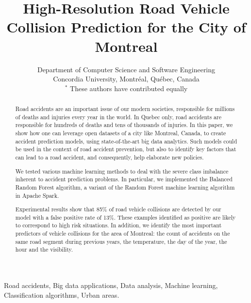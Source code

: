 \documentclass[conference]{IEEEtran}
\begin{document}
\title{High-Resolution Road Vehicle Collision Prediction for the City of Montreal}
\author{
Department of Computer Science and Software Engineering \\
Concordia University, Montréal, Québec, Canada\\
$^*$ These authors have contributed equally

}

\maketitle

\begin{abstract}

Road accidents are an important issue of our modern societies, responsible
for millions of deaths and injuries every year in the world. In Quebec only, road accidents are responsible for hundreds of deaths and tens of thousands of injuries. 
In this paper, we show how one can leverage open datasets of a city like
Montreal, Canada, to create accident prediction models, using state-of-the-art
big data analytics.
Such models could be used in the context of road accident prevention, but also
to identify key factors that can lead to a road accident, and consequently, help
elaborate new policies.

We tested various machine learning methods to deal with the severe class imbalance inherent
to accident prediction problems. In particular, we implemented the Balanced Random Forest algorithm, a variant
of the Random Forest machine learning algorithm in Apache Spark.

Experimental results show that 85\% of road vehicle collisions are detected by our model with a false positive rate of 13\%. These examples identified as positive are likely to correspond to high risk situations.
In addition, we identify the most important predictors of vehicle collisions for the area of Montreal: the count of accidents on the same road segment during previous years, the temperature, the day of the year, the hour and the visibility.

\end{abstract}

\begin{IEEEkeywords}
Road accidents, Big data applications, Data analysis, Machine learning, Classification algorithms, Urban areas. 
\end{IEEEkeywords}
\end{document}
